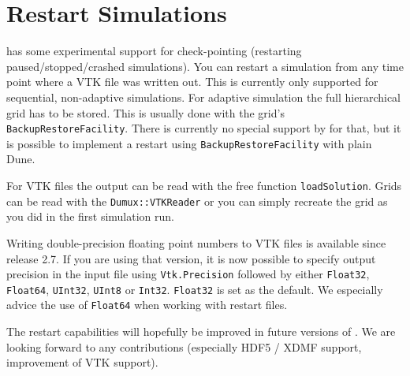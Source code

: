 
\section{Restart \Dumux Simulations}
\label{sc_restartsimulations}

\Dumux has some experimental support for check-pointing (restarting paused/stopped/crashed simulations).
You can restart a \Dumux simulation from any time point where a VTK file was written out.
This is currently only supported for sequential, non-adaptive simulations. For adaptive simulation
the full hierarchical grid has to be stored. This is usually done with the grid's \texttt{BackupRestoreFacility}.
There is currently no special support by \Dumux for that, but it is possible to implement
a restart using \texttt{BackupRestoreFacility} with plain Dune.

For VTK files the output can be read with the free function \texttt{loadSolution}. Grids can be read with
the \texttt{Dumux::VTKReader} or you can simply recreate the grid as you did in the first simulation run.

Writing double-precision floating point numbers to VTK files is available since \Dune release 2.7. If you are using that version, it is now possible to specify output precision in the input file using \texttt{Vtk.Precision} followed by either \texttt{Float32}, \texttt{Float64}, \texttt{UInt32}, \texttt{UInt8} or \texttt{Int32}. \texttt{Float32} is set as the default. We especially advice the use of \texttt{Float64} when working with restart files.

The restart capabilities will hopefully be improved in future versions of .
We are looking forward to any contributions (especially HDF5 / XDMF support, improvement of VTK support).
